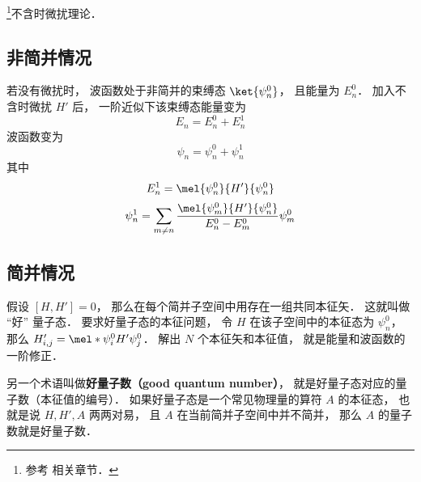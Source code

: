 
\begin{issues}
\issueDraft
\end{issues}

\footnote{参考 \cite{GriffQ} 相关章节．}不含时微扰理论．

\subsection{非简并情况}
若没有微扰时， 波函数处于非简并的束缚态 $\ket{\psi_n^0}$， 且能量为 $E_n^0$． 加入不含时微扰 $H'$ 后， 一阶近似下该束缚态能量变为
\begin{equation}
E_n = E_n^0 + E_n^1
\end{equation}
波函数变为
\begin{equation}
\psi_n = \psi_n^0 + \psi_n^1
\end{equation}
其中
\begin{equation}
E_n^1 = \mel{\psi_n^0}{H'}{\psi_n^0}
\end{equation}
\begin{equation}
\psi_n^1 = \sum_{m \ne n} \frac{\mel{\psi_m^0}{H'}{\psi_n^0}}{E_n^0 - E_m^0} \psi_m^0
\end{equation}

\subsection{简并情况}
假设 $[H, H'] = 0$， 那么在每个简并子空间中用存在一组共同本征矢． 这就叫做 “好” 量子态． 要求好量子态的本征问题， 令 $H$ 在该子空间中的本征态为 $\psi_n^0$， 那么 $H'_{i,j} = \mel*{\psi_i^0}{H'}{\psi_j^0}$． 解出 $N$ 个本征矢和本征值， 就是能量和波函数的一阶修正．

另一个术语叫做\textbf{好量子数（good quantum number）}， 就是好量子态对应的量子数（本征值的编号）． 如果好量子态是一个常见物理量的算符 $A$ 的本征态， 也就是说 $H, H', A$ 两两对易， 且 $A$ 在当前简并子空间中并不简并， 那么 $A$ 的量子数就是好量子数．
